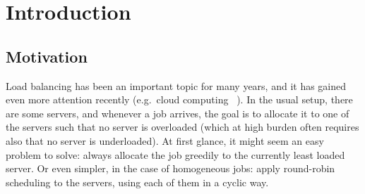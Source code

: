 \chapter{Introduction}\label{introduction}

\ifpdf
    \graphicspath{{Chapter1/Figs/Raster/}{Chapter1/Figs/PDF/}{Chapter1/Figs/}}
\else
    \graphicspath{{Chapter1/Figs/Vector/}{Chapter1/Figs/}}
\fi


\section{Motivation}


Load balancing has been an important topic for many years, and it has gained even more attention recently (e.g.\ cloud computing~\cite{mishra2020cloud} ). In the usual setup, there are some servers, and whenever a job arrives, the goal is to allocate it to one of the servers such that no server is overloaded (which at high burden often requires also that no server is underloaded). At first glance, it might seem an easy problem to solve: always allocate the job greedily to the currently least loaded server. Or even simpler, in the case of homogeneous jobs: apply round-robin scheduling to the servers, using each of them in a cyclic way. 

